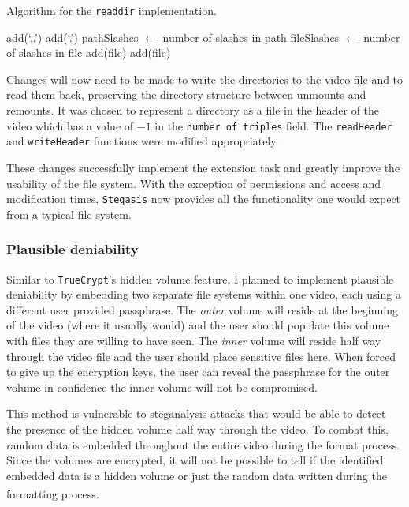 \documentclass[paper=a4, fontsize=11pt,twoside]{scrartcl}
\numberwithin{table}{section}
\numberwithin{figure}{section}
\numberwithin{algorithm}{section}
\begin{document}
\begin{algorithm}
\caption{Algorithm for the \texttt{readdir} implementation.}
\label{dirs}
\begin{algorithmic}[1]
\State add(`..')
\State add(`.')
\State pathSlashes $\gets$ number of slashes in path
	\State fileSlashes $\gets$ number of slashes in file
			\State add(file)
		\EndIf
		\State add(file)
	\EndIf
\EndFor
\end{algorithmic}
\end{algorithm}

Changes will now need to be made to write the directories to the video file and to read them back, preserving the directory structure between unmounts and remounts. It was chosen to represent a directory as a file in the header of the video which has a value of $-1$ in the \texttt{number of triples} field. The \texttt{readHeader} and \texttt{writeHeader} functions were modified appropriately.

These changes successfully implement the extension task and greatly improve the usability of the file system. With the exception of permissions and access and modification times, \texttt{Stegasis} now provides all the functionality one would expect from a typical file system.


\subsubsection{Plausible deniability}

Similar to \texttt{TrueCrypt}'s hidden volume feature, I planned to implement plausible deniability by embedding two separate file systems within one video, each using a different user provided passphrase. The \textit{outer} volume will reside at the beginning of the video (where it usually would) and the user should populate this volume with files they are willing to have seen. The \textit{inner} volume will reside half way through the video file and the user should place sensitive files here. When forced to give up the encryption keys, the user can reveal the passphrase for the outer volume in confidence the inner volume will not be compromised.

This method is vulnerable to steganalysis attacks that would be able to detect the presence of the hidden volume half way through the video. To combat this, random data is embedded throughout the entire video during the format process. Since the volumes are encrypted, it will not be possible to tell if the identified embedded data is a hidden volume or just the random data written during the formatting process\textsuperscript{\cite{random}}.
\end{document}
